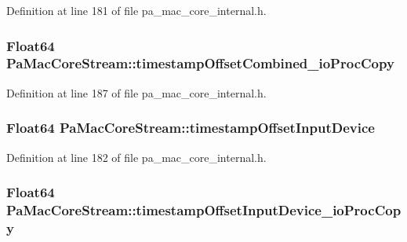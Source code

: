 Definition at line 181 of file pa\+\_\+mac\+\_\+core\+\_\+internal.\+h.

\subsubsection[{\texorpdfstring{timestamp\+Offset\+Combined\+\_\+io\+Proc\+Copy}{timestampOffsetCombined_ioProcCopy}}]{\setlength{\rightskip}{0pt plus 5cm}Float64 Pa\+Mac\+Core\+Stream\+::timestamp\+Offset\+Combined\+\_\+io\+Proc\+Copy}\hypertarget{struct_pa_mac_core_stream_a8835149b249b0d65891cb7b7104bbd53}{}\label{struct_pa_mac_core_stream_a8835149b249b0d65891cb7b7104bbd53}


Definition at line 187 of file pa\+\_\+mac\+\_\+core\+\_\+internal.\+h.

\subsubsection[{\texorpdfstring{timestamp\+Offset\+Input\+Device}{timestampOffsetInputDevice}}]{\setlength{\rightskip}{0pt plus 5cm}Float64 Pa\+Mac\+Core\+Stream\+::timestamp\+Offset\+Input\+Device}\hypertarget{struct_pa_mac_core_stream_a478d46d9d93bdc6d3cdb2009236c1d9e}{}\label{struct_pa_mac_core_stream_a478d46d9d93bdc6d3cdb2009236c1d9e}


Definition at line 182 of file pa\+\_\+mac\+\_\+core\+\_\+internal.\+h.

\subsubsection[{\texorpdfstring{timestamp\+Offset\+Input\+Device\+\_\+io\+Proc\+Copy}{timestampOffsetInputDevice_ioProcCopy}}]{\setlength{\rightskip}{0pt plus 5cm}Float64 Pa\+Mac\+Core\+Stream\+::timestamp\+Offset\+Input\+Device\+\_\+io\+Proc\+Copy}\hypertarget{struct_pa_mac_core_stream_a5214bc58179dd3ab933567bff3eb0c71}{}\label{struct_pa_mac_core_stream_a5214bc58179dd3ab933567bff3eb0c71}


